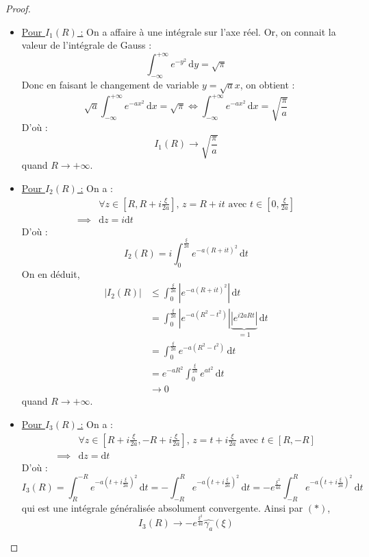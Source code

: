 \begin{proof}
\begin{itemize}
			\item \underline{Pour $I_1(R)$ :} On a affaire à une intégrale sur l'axe réel. Or, on connait la valeur de l'intégrale de Gauss :
			\[ \int_{-\infty}^{+\infty} e^{-y^2} \, \mathrm{d}y = \sqrt{\pi} \]
			Donc en faisant le changement de variable $y = \sqrt{a}x$, on obtient :
			\[ \sqrt{a} \int_{-\infty}^{+\infty} e^{-ax^2} \, \mathrm{d}x = \sqrt{\pi} \iff \int_{-\infty}^{+\infty} e^{-ax^2} \, \mathrm{d}x = \sqrt{\frac{\pi}{a}} \]
			D'où :
			\[ I_1(R) \longrightarrow \sqrt{\frac{\pi}{a}} \]
			quand $R \longrightarrow +\infty$.
			\item \underline{Pour $I_2(R)$ :} On a :
			\begin{align*}
				&\forall z \in \left[ R, R + i \frac{\xi}{2a} \right], \, z = R + it \text{ avec $t \in \left[ 0, \frac{\xi}{2a} \right]$} \\
				\implies& \mathrm{d}z = i\mathrm{d}t
			\end{align*}
			D'où :
			\[ I_2(R) = i \int_0^{\frac{\xi}{2a}} e^{-a (R+it)^2} \, \mathrm{d}t \]
			On en déduit,
			\begin{align*}
				|I_2(R)| &\leq \int_0^{\frac{\xi}{2a}} \left| e^{-a (R+it)^2} \right| \, \mathrm{d}t \\
				&= \int_0^{\frac{\xi}{2a}} \left| e^{-a(R^2 - t^2)} \right| \underbrace{\left| e^{i 2aRt} \right|}_{= 1} \, \mathrm{d}t \\
				&= \int_0^{\frac{\xi}{2a}} e^{-a(R^2 - t^2)} \, \mathrm{d}t \\
				&= e^{-aR^2} \int_0^{\frac{\xi}{2a}} e^{at^2} \, \mathrm{d}t \\
				&\longrightarrow 0
			\end{align*}
			quand $R \longrightarrow +\infty$.
			\item \underline{Pour $I_3(R)$ :} On a :
			\begin{align*}
				&\forall z \in \left[ R + i \frac{\xi}{2a}, -R + i \frac{\xi}{2a} \right], \, z = t + i\frac{\xi}{2a} \text{ avec $t \in \left[ R, -R \right]$} \\
				\implies& \mathrm{d}z = \mathrm{d}t
			\end{align*}
			D'où :
			\[ I_3(R) = \int_R^{-R} e^{-a \left(t + i \frac{\xi}{2a} \right)^2} \, \mathrm{d}t = - \int_{-R}^R e^{-a \left(t + i \frac{\xi}{2a} \right)^2} \, \mathrm{d}t = - e^{\frac{\xi^2}{4a}} \int_{-R}^R e^{-a \left( t + i \frac{\xi}{2a} \right)^2} \, \mathrm{d}t \]
			qui est une intégrale généralisée absolument convergente. Ainsi par $(*)$,
			\[ I_3(R) \longrightarrow - e^{\frac{\xi^2}{4a}} \widehat{\gamma_a}(\xi) \]

\end{itemize}
\end{proof}
